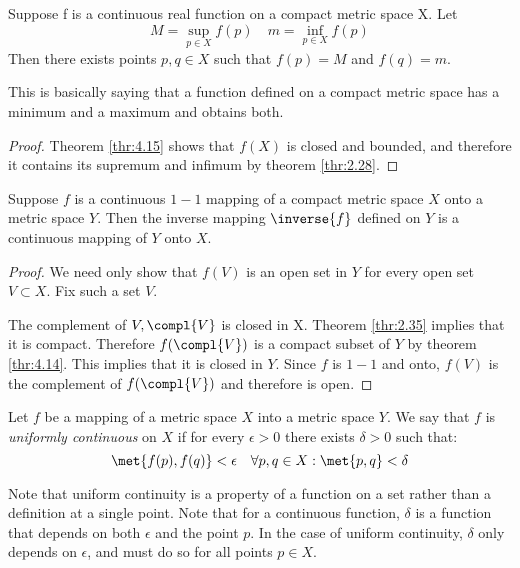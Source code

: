 \documentclass[12pt, letterpaper]{paper}
\begin{document}
\begin{theorem}
  \label{thr:4.16}
  Suppose f is a continuous real function on a compact metric space
  X. Let
  \begin{equation*}
    M = \sup_{p\in X}f(p) \quad m = \inf_{p \in X}f(p)
  \end{equation*}
  Then there exists points $p,q \in X$ such that $f(p) = M$ and
  $f(q) = m$.
\end{theorem}
This is basically saying that a function defined on a compact metric
space has a minimum and a maximum and obtains both.
\begin{proof}
  Theorem \ref{thr:4.15} shows that $f(X)$ is closed and bounded, and
  therefore it contains its supremum and infimum by theorem
  \ref{thr:2.28}.
\end{proof}

\begin{theorem}
  \label{thr:4.17}
  Suppose $f$ is a continuous $1-1$ mapping of a compact metric space
  $X$ onto a metric space $Y$. Then the inverse mapping $\inverse{f}$
  defined on $Y$ is a continuous mapping of $Y$ onto $X$.
  \begin{proof}
    We need only show that $f(V)$ is an open set in $Y$ for every open
    set $V \subset X$. Fix such a set $V$.

    The complement of $V, \compl{V}$ is closed in X. Theorem
    \ref{thr:2.35} implies that it is compact. Therefore
    $f(\compl{V})$ is a compact subset of $Y$ by theorem
    \ref{thr:4.14}. This implies that it is closed in $Y$. Since $f$
    is $1-1$ and onto, $f(V)$ is the complement of $f(\compl{V})$ and
    therefore is open.
  \end{proof}
\end{theorem}

Let $f$ be a mapping of a metric space $X$ into a metric space $Y$. We
say that $f$ is \emph{uniformly continuous} on $X$ if for every
$\epsilon > 0$ there exists $\delta > 0$ such that:
\begin{equation*}
  \met{f(p), f(q)} < \epsilon \quad \forall p,q \in X: \met{p,q} < \delta
\end{equation*}

Note that uniform continuity is a property of a function on a set
rather than a definition at a single point. Note that for a continuous
function, $\delta$ is a function that depends on both $\epsilon$ and the point
$p$. In the case of uniform continuity, $\delta$ only depends on
$\epsilon$, and must do so for all points $p \in X$.
\end{document}
